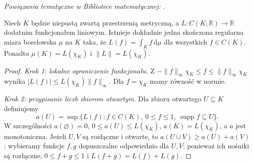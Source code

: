 \noindent\emph{Powiązania tematyczne w Bibliotece matematycznej:} .

\begin{twierdzenie}
\label{thm:compact-riesz-21}
Niech $K$ będzie niepustą zwartą przestrzenią metryczną,
a $L:C(K;\mathbb R)\to\mathbb R$ dodatnim funkcjonałem
liniowym. Istnieje dokładnie jedna skończona regularna
miara borelowska $\mu$ na $K$ taka, że
$L(f)=\int_Kf\,\mathrm d\mu$ dla wszystkich $f\in C(K)$.
Ponadto $\mu(K)=L(\chi_K)$ i
$\|L\|=L(\chi_K)$.
\end{twierdzenie}
\begin{proof}
\emph{Krok 1: lokalne ograniczenie funkcjonału.}
Z $-\|f\|_\infty\chi_K\le f\le\|f\|_\infty\chi_K$
wynika $|L(f)|\le L(\chi_K)\|f\|_\infty$.
Dla $f=\chi_K$ mamy równość w normie.

\emph{Krok 2: przypisanie liczb zbiorom otwartym.}
Dla zbioru otwartego $U\subseteq K$ definiujemy
\begin{equation}\label{eq:open-content-21}
 a(U)=\sup\{L(f): f\in C(K),\ 0\le f\le1,\
          \operatorname{supp}f\subseteq U\}.
\end{equation}
W szczególności $a(\varnothing)=0$,
$0\le a(U)\le L(\chi_K)$, $a(K)=L(\chi_K)$,
a $a$ jest monotoniczna. Jeżeli $U,V$ są rozłączne
i otwarte, to $a(U\cup V)\ge a(U)+a(V)$:
wybieramy funkcje $f,g$ dopuszczalne odpowiednio dla
$U,V$; ponieważ ich nośniki są rozłączne,
$0\le f+g\le1$ i $L(f+g)=L(f)+L(g)$.


\end{proof}

